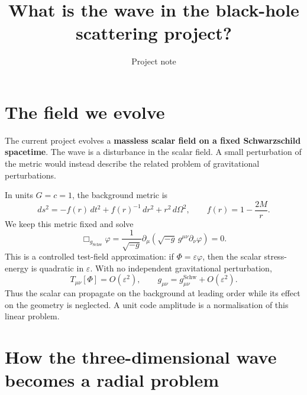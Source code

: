 \documentclass[11pt,a4paper]{article}
\title{What is the wave in the black-hole scattering project?}
\author{Project note}
\date{}
\begin{document}
\maketitle
\vspace{-1.5em}

\section{The field we evolve}

The current project evolves a \textbf{massless scalar field on a fixed
Schwarzschild spacetime}. The wave is a disturbance in the scalar field.
A small perturbation of the metric would instead describe the related
problem of gravitational perturbations.

In units \(G=c=1\), the background metric is
\begin{equation}
 ds^2=-f(r)\,dt^2+f(r)^{-1}\,dr^2+r^2\,d\Omega^2,
 \qquad f(r)=1-\frac{2M}{r}.
\end{equation}
We keep this metric fixed and solve
\begin{equation}
 \Box_{g_{\mathrm{Schw}}}\varphi
 =\frac{1}{\sqrt{-g}}\partial_\mu
 \left(\sqrt{-g}\,g^{\mu\nu}\partial_\nu\varphi\right)=0.
\end{equation}
This is a controlled test-field approximation: if
\(\Phi=\varepsilon\varphi\), then the scalar stress-energy is quadratic
in \(\varepsilon\). With no independent gravitational perturbation,
\begin{equation}
 T_{\mu\nu}[\Phi]=O(\varepsilon^2),
 \qquad g_{\mu\nu}=g^{\mathrm{Schw}}_{\mu\nu}+O(\varepsilon^2).
\end{equation}
Thus the scalar can propagate on the background at leading order while
its effect on the geometry is neglected. A unit code amplitude is a
normalisation of this linear problem.

\section{How the three-dimensional wave becomes a radial problem}
\end{document}
